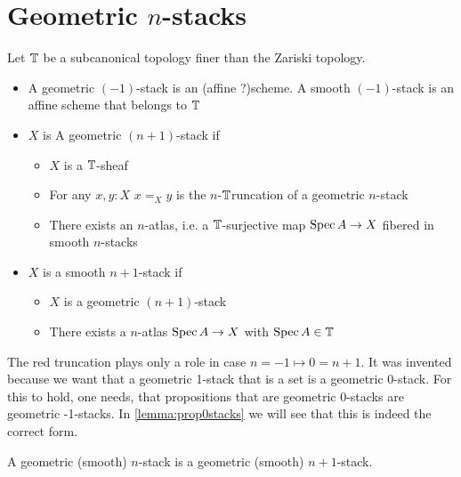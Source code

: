 \documentclass{article}
\newcommand{\affineA}{(affine ?)}
\newcommand{\red}[1]{{\color{red} #1}}
\begin{document}
\section{Geometric $n$-stacks}

\begin{definition}
Let $\mathbb{T}$ be a subcanonical topology finer than the Zariski topology.
    \begin{itemize}
        
    
        \item A geometric $(-1)$-stack is an \affineA scheme. A smooth $(-1)$-stack is an affine scheme that belongs to $\mathbb{T}$\\
        
        \item $X$ is A geometric $(n+1)$-stack if 
        \begin{itemize}
            \item $X$ is a $\mathbb{T}$-sheaf
            \item For any $x , y : X$ $x =_X y$ is \red{the $n$-$\mathbb{T}$runcation of} a geometric $n$-stack
            \item There exists an $n$-atlas, i.e. a $\mathbb{T}$-surjective map $\operatorname{Spec} A \to X$ fibered in smooth $n$-stacks
        \end{itemize}
        \item $X$ is a smooth $n+1$-stack if
        \begin{itemize}
            \item $X$ is a geometric $(n+1)$-stack
            \item There exists a $n$-atlas $\operatorname{Spec} A \to X$ with $\operatorname{Spec} A \in \mathbb{T}$
        \end{itemize}
    \end{itemize}
    
\end{definition}

\begin{rmk}
    \red{The red truncation plays only a role in case $n=-1 \mapsto 0 = n+1$.
    }
    It was invented because we want that a geometric 1-stack that is a set is a geometric 0-stack. For this to hold, one needs, that propositions that are geometric 0-stacks are geometric -1-stacks. In \ref{lemma:prop0stacks} we will see that this is indeed the correct form.
\end{rmk}
\begin{lemma}{\label{lemma:succStab}}
    A geometric (smooth) $n$-stack is a geometric (smooth) $n+1$-stack.
\end{lemma}
\end{document}
